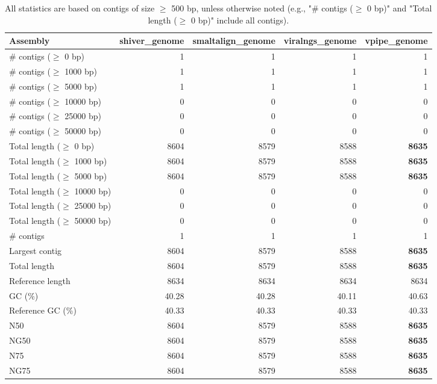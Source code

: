 \documentclass[12pt,a4paper]{article}
\begin{document}
\begin{table}[ht]
\begin{center}
\caption{All statistics are based on contigs of size $\geq$ 500 bp, unless otherwise noted (e.g., "\# contigs ($\geq$ 0 bp)" and "Total length ($\geq$ 0 bp)" include all contigs).}
\begin{tabular}{|l*{4}{|r}|}
\hline
Assembly & shiver\_genome & smaltalign\_genome & viralngs\_genome & vpipe\_genome \\ \hline
\# contigs ($\geq$ 0 bp) & 1 & 1 & 1 & 1 \\ \hline
\# contigs ($\geq$ 1000 bp) & 1 & 1 & 1 & 1 \\ \hline
\# contigs ($\geq$ 5000 bp) & 1 & 1 & 1 & 1 \\ \hline
\# contigs ($\geq$ 10000 bp) & 0 & 0 & 0 & 0 \\ \hline
\# contigs ($\geq$ 25000 bp) & 0 & 0 & 0 & 0 \\ \hline
\# contigs ($\geq$ 50000 bp) & 0 & 0 & 0 & 0 \\ \hline
Total length ($\geq$ 0 bp) & 8604 & 8579 & 8588 & {\bf 8635} \\ \hline
Total length ($\geq$ 1000 bp) & 8604 & 8579 & 8588 & {\bf 8635} \\ \hline
Total length ($\geq$ 5000 bp) & 8604 & 8579 & 8588 & {\bf 8635} \\ \hline
Total length ($\geq$ 10000 bp) & 0 & 0 & 0 & 0 \\ \hline
Total length ($\geq$ 25000 bp) & 0 & 0 & 0 & 0 \\ \hline
Total length ($\geq$ 50000 bp) & 0 & 0 & 0 & 0 \\ \hline
\# contigs & 1 & 1 & 1 & 1 \\ \hline
Largest contig & 8604 & 8579 & 8588 & {\bf 8635} \\ \hline
Total length & 8604 & 8579 & 8588 & {\bf 8635} \\ \hline
Reference length & 8634 & 8634 & 8634 & 8634 \\ \hline
GC (\%) & 40.28 & 40.28 & 40.11 & 40.63 \\ \hline
Reference GC (\%) & 40.33 & 40.33 & 40.33 & 40.33 \\ \hline
N50 & 8604 & 8579 & 8588 & {\bf 8635} \\ \hline
NG50 & 8604 & 8579 & 8588 & {\bf 8635} \\ \hline
N75 & 8604 & 8579 & 8588 & {\bf 8635} \\ \hline
NG75 & 8604 & 8579 & 8588 & {\bf 8635} \\ \hline

\end{tabular}
\end{center}
\end{table}
\end{document}
